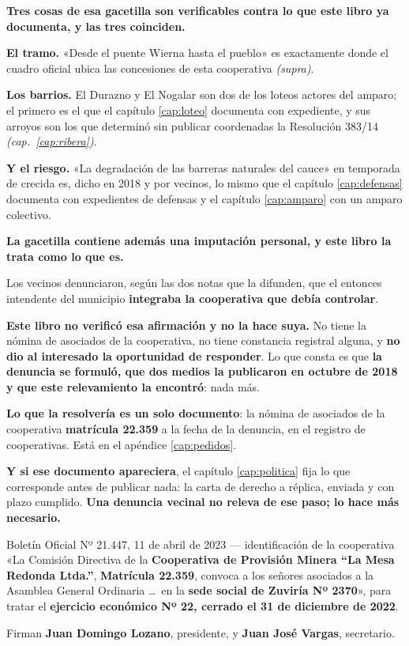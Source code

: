 \textbf{Tres cosas de esa gacetilla son verificables contra lo que este libro ya documenta, y
las tres coinciden.}

\textbf{El tramo.} «Desde el puente Wierna hasta el pueblo» es exactamente donde el cuadro
oficial ubica las concesiones de esta cooperativa \textit{(supra)}.

\textbf{Los barrios.} El Durazno y El Nogalar son dos de los loteos actores del amparo; el primero es el que el capítulo \ref{cap:loteo} documenta con expediente, y sus arroyos son los que determinó sin publicar coordenadas la Resolución 383/14 \textit{(cap.\ \ref{cap:ribera})}.

\textbf{Y el riesgo.} «La degradación de las barreras naturales del cauce» en temporada de
crecida es, dicho en 2018 y por vecinos, lo mismo que el capítulo \ref{cap:defensas} documenta
con expedientes de defensas y el capítulo \ref{cap:amparo} con un amparo colectivo.

\begin{cautela}
\textbf{La gacetilla contiene además una imputación personal, y este libro la trata como lo que
es.}

Los vecinos denunciaron, según las dos notas que la difunden, que el entonces intendente
del municipio \textbf{integraba la cooperativa que debía controlar}.

\textbf{Este libro no verificó esa afirmación y no la hace suya.} No tiene la nómina de
asociados de la cooperativa, no tiene constancia registral alguna, y \textbf{no dio al
interesado la oportunidad de responder}. Lo que consta es que \textbf{la denuncia se formuló,
que dos medios la publicaron en octubre de 2018 y que este relevamiento la encontró}: nada más.

\textbf{Lo que la resolvería es un solo documento}: la nómina de asociados de la cooperativa
\textbf{matrícula 22.359} a la fecha de la denuncia, en el registro de cooperativas. Está en el
apéndice \ref{cap:pedidos}.

\textbf{Y si ese documento apareciera}, el capítulo \ref{cap:politica} fija lo que corresponde
antes de publicar nada: la carta de derecho a réplica, enviada y con plazo cumplido. \textbf{Una
denuncia vecinal no releva de ese paso; lo hace más necesario.}
\end{cautela}

\begin{ficha}{Boletín Oficial Nº 21.447, 11 de abril de 2023 --- identificación de la cooperativa}
«La Comisión Directiva de la \textbf{Cooperativa de Provisión Minera “La Mesa Redonda Ltda.”},
\textbf{Matrícula 22.359}, convoca a los señores asociados a la Asamblea General Ordinaria
\ldots\ en la \textbf{sede social de Zuviría Nº 2370}», para tratar el \textbf{ejercicio
económico Nº 22, cerrado el 31 de diciembre de 2022}.

Firman \textbf{Juan Domingo Lozano}, presidente, y \textbf{Juan José Vargas}, secretario.
\end{ficha}

